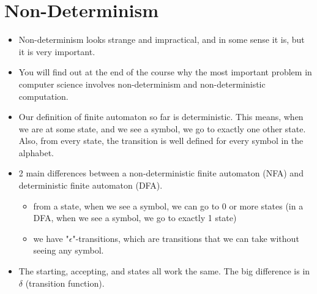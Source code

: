 \documentclass[11pt,a4paper]{article}
\begin{document}
\tableofcontents


\section{Non-Determinism}
\begin{itemize}
    \item Non-determinism looks strange and impractical, and in some sense it is, but it is very important.
    \item You will find out at the end of the course why the most important problem in computer science involves non-determinism and non-deterministic computation.
    \item Our definition of finite automaton so far is deterministic. This means, when we are at some state, and we see a symbol, we go to exactly one other state. Also, from every state, the transition is well defined for every symbol in the alphabet.
    \item 2 main differences between a non-deterministic finite automaton (NFA) and deterministic finite automaton (DFA).
    \begin{itemize}
        \item from a state, when we see a symbol, we can go to 0 or more states (in a DFA, when we see a symbol, we go to exactly 1 state)
        \item we have "$\epsilon$"-transitions, which are transitions that we can take without seeing any symbol.
    \end{itemize}
    \item The starting, accepting, and states all work the same. The big difference is in $\delta$ (transition function).
\end{itemize}
\end{document}
